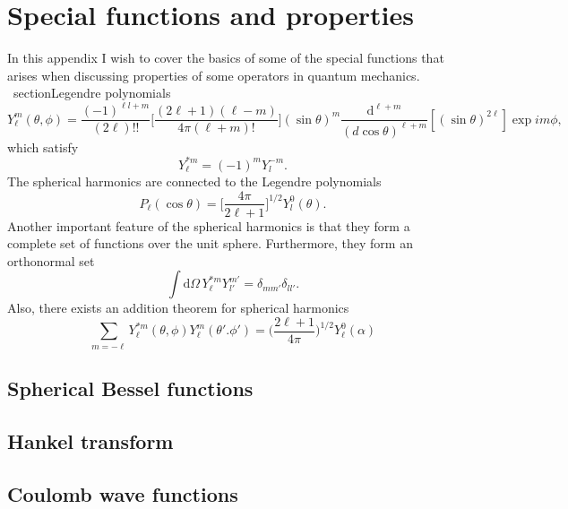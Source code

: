 \chapter{Special functions and properties}
In this appendix I wish to cover the basics of some of the special functions that arises when discussing properties of some operators in quantum mechanics.
\   section{Legendre polynomials}
\begin{equation}
    Y_{\ell}^m(\theta,\phi) = \frac{(-1)^{{\ell}l+m}}{(2\ell)!!}\bigg[ \frac{(2\ell+1)(\ell-m)}{4\pi(\ell+m)!}\bigg](\sin\theta)^m\frac{\text{d}^{\ell+m}}{(d\cos\theta)^{\ell+m}}[(\sin\theta)^{2\ell}]\exp{i m\phi},
\end{equation}
which satisfy
\begin{equation}
    Y_\ell^{*m}=(-1)^m Y_{l}^{-m}.
\end{equation}
The spherical harmonics are connected to the Legendre polynomials
\begin{equation}
    P_\ell(\cos\theta) = \big[ \frac{4\pi}{2\ell+1} \big]^{1/2}Y_{l}^0(\theta).
\end{equation}
Another important feature of the spherical harmonics is that they form a complete set of functions over the unit sphere. Furthermore, they form an orthonormal set
\begin{equation}
    \int \text{d}\Omega \, Y_\ell^{*m} Y_{l'}^{m'} = \delta_{mm'}\delta_{ll'}.
\end{equation}
Also, there exists an addition theorem for spherical harmonics
\begin{equation}
    \sum_{m=-\ell} Y_\ell^{*m}(\theta,\phi)Y_\ell^{m}(\theta'.\phi') = \bigg( \frac{2\ell+1}{4\pi}\bigg)^{1/2}Y_\ell^0(\alpha)
\end{equation}
\section{Spherical Bessel functions}
\section{Hankel transform}
\section{Coulomb wave functions}



